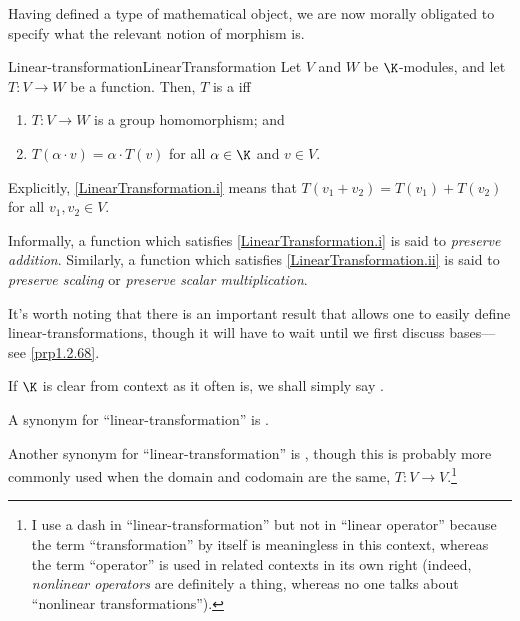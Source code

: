 Having defined a type of mathematical object, we are now morally obligated to specify what the relevant notion of morphism is.
\begin{dfn}{Linear-transformation}{LinearTransformation}
	Let $V$ and $W$ be $\K$-modules, and let $T\colon V\rightarrow W$ be a function.  Then, $T$ is a  iff
	\begin{enumerate}
		\item \label{LinearTransformation.i}$T\colon V\rightarrow W$ is a group homomorphism; and
		\item \label{LinearTransformation.ii}$T(\alpha \cdot v)=\alpha \cdot T(v)$ for all $\alpha \in \K$ and $v\in V$.
	\end{enumerate}
	\begin{rmk}
		Explicitly, \cref{LinearTransformation.i} means that $T(v_1+v_2)=T(v_1)+T(v_2)$ for all $v_1,v_2\in V$.
	\end{rmk}
	\begin{rmk}
		Informally, a function which satisfies \cref{LinearTransformation.i} is said to \emph{preserve addition}.  Similarly, a function which satisfies \cref{LinearTransformation.ii} is said to \emph{preserve scaling} or \emph{preserve scalar multiplication}.
	\end{rmk}
	\begin{rmk}
		It's worth noting that there is an important result that allows one to easily define linear-transformations, though it will have to wait until we first discuss bases---see \cref{prp1.2.68}.
	\end{rmk}
	\begin{rmk}
		If $\K$ is clear from context as it often is, we shall simply say .
	\end{rmk}
	\begin{rmk}
		A synonym for ``linear-transformation'' is \index{Module homomorphism}.
	\end{rmk}
	\begin{rmk}
		Another synonym for ``linear-transformation'' is , though this is probably more commonly used when the domain and codomain are the same, $T\colon V\rightarrow V$.\footnote{I use a dash in ``linear-transformation'' but not in ``linear operator'' because the term ``transformation'' by itself is meaningless in this context, whereas the term ``operator'' is used in related contexts in its own right (indeed, \emph{nonlinear operators} are definitely a thing, whereas no one talks about ``nonlinear transformations'').}
	\end{rmk}
\end{dfn}

